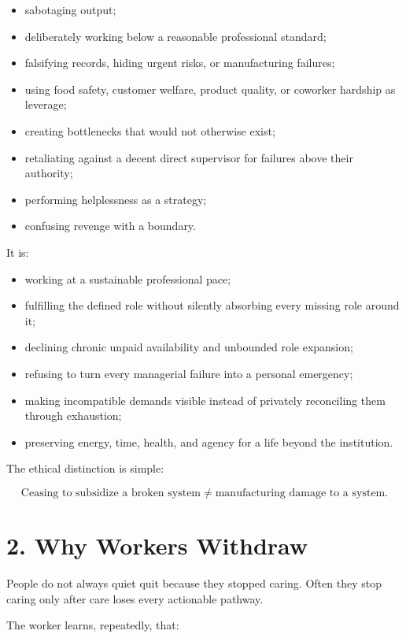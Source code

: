 \documentclass[11pt,oneside]{article}
\providecommand{\tightlist}{%
  \setlength{\itemsep}{0.22em}\setlength{\parskip}{0pt}}
\begin{document}
\begin{itemize}
\tightlist
\item
  sabotaging output;
\item
  deliberately working below a reasonable professional standard;
\item
  falsifying records, hiding urgent risks, or manufacturing failures;
\item
  using food safety, customer welfare, product quality, or coworker
  hardship as leverage;
\item
  creating bottlenecks that would not otherwise exist;
\item
  retaliating against a decent direct supervisor for failures above
  their authority;
\item
  performing helplessness as a strategy;
\item
  confusing revenge with a boundary.
\end{itemize}

It is:

\begin{itemize}
\tightlist
\item
  working at a sustainable professional pace;
\item
  fulfilling the defined role without silently absorbing every missing
  role around it;
\item
  declining chronic unpaid availability and unbounded role expansion;
\item
  refusing to turn every managerial failure into a personal emergency;
\item
  making incompatible demands visible instead of privately reconciling
  them through exhaustion;
\item
  preserving energy, time, health, and agency for a life beyond the
  institution.
\end{itemize}

The ethical distinction is simple:

\[
\boxed{\text{Ceasing to subsidize a broken system} \neq \text{manufacturing damage to a system}.}
\]

\section{2. Why Workers Withdraw}\label{why-workers-withdraw}

People do not always quiet quit because they stopped caring. Often they
stop caring only after care loses every actionable pathway.

The worker learns, repeatedly, that:
\end{document}
